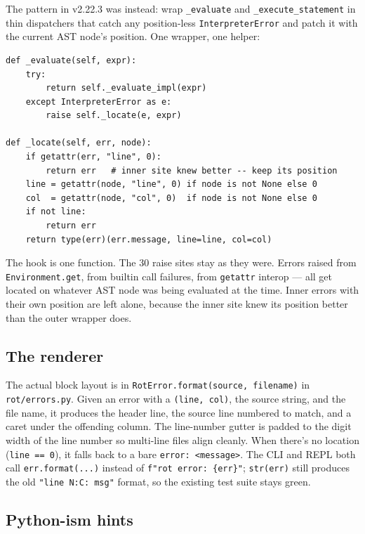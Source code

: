 \documentclass[11pt]{article}
\begin{document}
The pattern in v2.22.3 was instead: wrap \texttt{\_evaluate} and \texttt{\_execute\_statement} in thin dispatchers that catch any position-less \texttt{InterpreterError} and patch it with the current AST node's position. One wrapper, one helper:

\begin{lstlisting}[style=pystyle]
def _evaluate(self, expr):
    try:
        return self._evaluate_impl(expr)
    except InterpreterError as e:
        raise self._locate(e, expr)

def _locate(self, err, node):
    if getattr(err, "line", 0):
        return err   # inner site knew better -- keep its position
    line = getattr(node, "line", 0) if node is not None else 0
    col  = getattr(node, "col", 0)  if node is not None else 0
    if not line:
        return err
    return type(err)(err.message, line=line, col=col)
\end{lstlisting}

The hook is one function. The 30 raise sites stay as they were. Errors raised from \texttt{Environment.get}, from builtin call failures, from \texttt{getattr} interop --- all get located on whatever AST node was being evaluated at the time. Inner errors with their own position are left alone, because the inner site knew its position better than the outer wrapper does.

\subsection{The renderer}

The actual block layout is in \texttt{RotError.format(source, filename)} in \texttt{rot/errors.py}. Given an error with a \texttt{(line, col)}, the source string, and the file name, it produces the header line, the source line numbered to match, and a caret under the offending column. The line-number gutter is padded to the digit width of the line number so multi-line files align cleanly. When there's no location (\texttt{line == 0}), it falls back to a bare \texttt{error: <message>}. The CLI and REPL both call \texttt{err.format(...)} instead of \texttt{f"rot error: \{err\}"}; \texttt{str(err)} still produces the old \texttt{"line N:C: msg"} format, so the existing test suite stays green.

\subsection{Python-ism hints}
\end{document}
